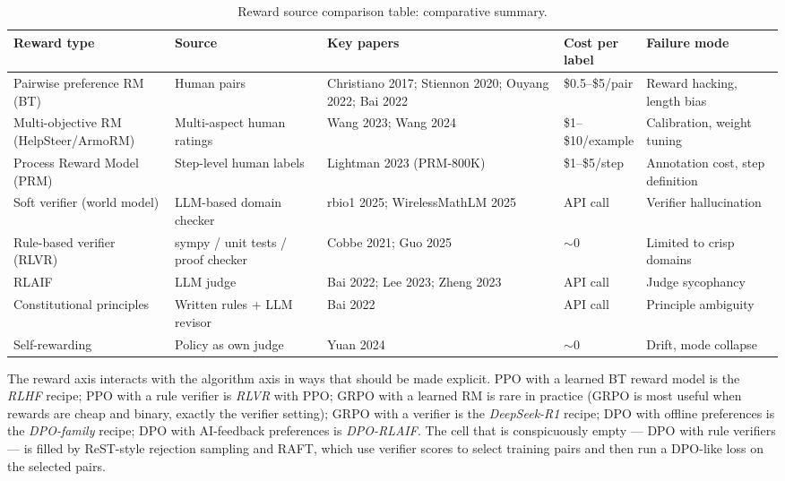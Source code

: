 \documentclass{article}
\begin{document}
\begin{table}[t]
\centering
\caption{Reward source comparison table: comparative summary.}
\label{tab:reward-source-comparison-table}
\begin{tabular}{>{\raggedright\arraybackslash}p{0.2176\linewidth}
  >{\raggedright\arraybackslash}p{0.2000\linewidth}
  >{\raggedright\arraybackslash}p{0.3118\linewidth}
  >{\raggedright\arraybackslash}p{0.0824\linewidth}
  >{\raggedright\arraybackslash}p{0.1882\linewidth}}
\toprule
Reward type & Source & Key papers & Cost per label & Failure mode \\
\midrule
Pairwise preference RM (BT) & Human pairs & Christiano 2017; Stiennon 2020; Ouyang 2022; Bai 2022 & \$0.5--\$5/pair & Reward hacking, length bias \\
Multi-objective RM (HelpSteer/ArmoRM) & Multi-aspect human ratings & Wang 2023; Wang 2024 & \$1--\$10/example & Calibration, weight tuning \\
Process Reward Model (PRM) & Step-level human labels & Lightman 2023 (PRM-800K) & \$1--\$5/step & Annotation cost, step definition \\
Soft verifier (world model) & LLM-based domain checker & rbio1 2025; WirelessMathLM 2025 & API call & Verifier hallucination \\
Rule-based verifier (RLVR) & sympy / unit tests / proof checker & Cobbe 2021; Guo 2025 & $\sim$0 & Limited to crisp domains \\
RLAIF & LLM judge & Bai 2022; Lee 2023; Zheng 2023 & API call & Judge sycophancy \\
Constitutional principles & Written rules + LLM revisor & Bai 2022 & API call & Principle ambiguity \\
Self-rewarding & Policy as own judge & Yuan 2024 & $\sim$0 & Drift, mode collapse \\
\end{tabular}
\end{table}

The reward axis interacts with the algorithm axis in ways that should be made explicit. PPO with a learned BT reward model is the \emph{RLHF} recipe; PPO with a rule verifier is \emph{RLVR} with PPO; GRPO with a learned RM is rare in practice (GRPO is most useful when rewards are cheap and binary, exactly the verifier setting); GRPO with a verifier is the \emph{DeepSeek-R1} recipe; DPO with offline preferences is the \emph{DPO-family} recipe; DPO with AI-feedback preferences is \emph{DPO-RLAIF}. The cell that is conspicuously empty --- DPO with rule verifiers --- is filled by ReST-style rejection sampling and RAFT, which use verifier scores to select training pairs and then run a DPO-like loss on the selected pairs.
\end{document}
